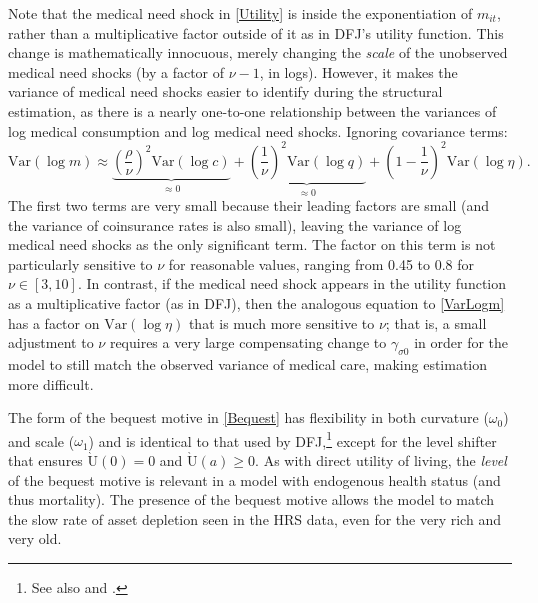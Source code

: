 \documentclass[12pt,pdftex,letterpaper]{article}
\newcommand{\Var}{\text{Var}}
\newcommand{\Utility}{\text{U}}
\newcommand{\Con}{c}
\newcommand{\Care}{m}
\newcommand{\MedShkParam}{\gamma}
\newcommand{\Assets}{a}
\newcommand{\Copay}{q}
\newcommand{\CRRAcon}{\rho}
\newcommand{\CRRAcare}{\nu}
\newcommand{\MedShk}{\eta}
\newcommand{\BequestParam}{\omega}
\begin{document}
Note that the medical need shock in \eqref{Utility} is inside the exponentiation of $\Care_{it}$, rather than a multiplicative factor outside of it as in DFJ's utility function.  This change is mathematically innocuous, merely changing the \textit{scale} of the unobserved medical need shocks (by a factor of $\CRRAcare - 1$, in logs).  However, it makes the variance of medical need shocks easier to identify during the structural estimation, as there is a nearly one-to-one relationship between the variances of log medical consumption and log medical need shocks.  Ignoring covariance terms:
\begin{equation}\label{VarLogm}
\Var (\log \Care) \approx \underbrace{\left( \frac{\CRRAcon}{\CRRAcare} \right)^2  \Var(\log \Con)}_{\approx 0} + \underbrace{\left(\frac{1}{\CRRAcare} \right)^2 \Var (\log \Copay)}_{\approx 0} + \left(1 - \frac{1}{\CRRAcare} \right)^2 \Var(\log \MedShk).
\end{equation}
The first two terms are very small because their leading factors are small (and the variance of coinsurance rates is also small), leaving the variance of log medical need shocks as the only significant term.  The factor on this term is not particularly sensitive to $\CRRAcare$ for reasonable values, ranging from 0.45 to 0.8 for $\CRRAcare \in [3,10]$.  In contrast, if the medical need shock appears in the utility function as a multiplicative factor (as in DFJ), then the analogous equation to \eqref{VarLogm} has a factor on $\Var(\log \MedShk)$ that is much more sensitive to $\CRRAcare$; that is, a small adjustment to $\CRRAcare$ requires a very large compensating change to $\MedShkParam_{\sigma 0}$ in order for the model to still match the observed variance of medical care, making estimation more difficult.

The form of the bequest motive in \eqref{Bequest} has flexibility in both curvature ($\BequestParam_0$) and scale ($\BequestParam_1$) and is identical to that used by DFJ,\footnote{See also \cite{lockwood12} and \cite{caplin11}.} except for the level shifter that ensures $\grave{\Utility}(0) = 0$ and $\grave{\Utility}(\Assets) \geq 0$.  As with direct utility of living, the \textit{level} of the bequest motive is relevant in a model with endogenous health status (and thus mortality).  The presence of the bequest motive allows the model to match the slow rate of asset depletion seen in the HRS data, even for the very rich and very old.
\end{document}
